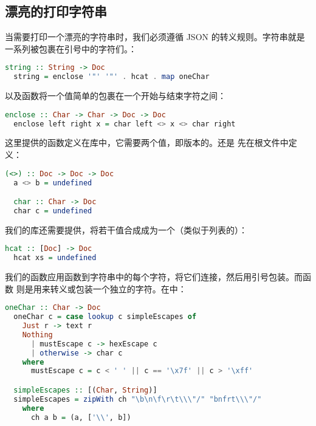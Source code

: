 \documentclass[./main.tex]{subfiles}
\begin{document}
\subsection*{漂亮的打印字符串}

当需要打印一个漂亮的字符串时，我们必须遵循 JSON 的转义规则。字符串就是一系列被包裹在引号中的字符们。：

\begin{lstlisting}[language=Haskell]
  string :: String -> Doc
  string = enclose '"' '"' . hcat . map oneChar
\end{lstlisting}

以及函数将一个值简单的包裹在一个开始与结束字符之间：

\begin{lstlisting}[language=Haskell]
  enclose :: Char -> Char -> Doc -> Doc
  enclose left right x = char left <> x <> char right
\end{lstlisting}

这里提供的\acode{<>}函数定义在库中，它需要两个值，即版本的\acode{(++)}。还是
先在根文件中定义：

\begin{lstlisting}[language=Haskell]
  (<>) :: Doc -> Doc -> Doc
  a <> b = undefined

  char :: Char -> Doc
  char c = undefined
\end{lstlisting}

我们的库还需要提供，将若干值合成成为一个（类似于列表的）：

\begin{lstlisting}[language=Haskell]
  hcat :: [Doc] -> Doc
  hcat xs = undefined
\end{lstlisting}

我们的函数应用函数到字符串中的每个字符，将它们连接，然后用引号包装。而函数
则是用来转义或包装一个独立的字符。在中：

\begin{lstlisting}[language=Haskell]
  oneChar :: Char -> Doc
  oneChar c = case lookup c simpleEscapes of
    Just r -> text r
    Nothing
      | mustEscape c -> hexEscape c
      | otherwise -> char c
    where
      mustEscape c = c < ' ' || c == '\x7f' || c > '\xff'

  simpleEscapes :: [(Char, String)]
  simpleEscapes = zipWith ch "\b\n\f\r\t\\\"/" "bnfrt\\\"/"
    where
      ch a b = (a, ['\\', b])
\end{lstlisting}
\end{document}
